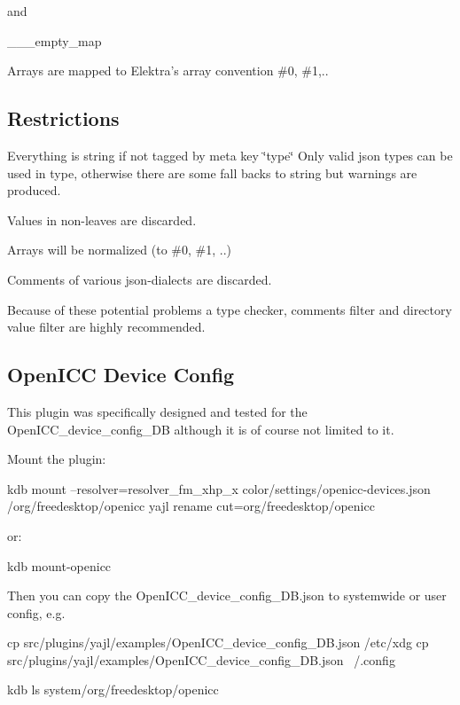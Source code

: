 and \begin{DoxyVerb}    ___empty_map
\end{DoxyVerb}


Arrays are mapped to Elektra's array convention \#0, \#1,..

\subsection*{Restrictions}


\begin{DoxyItemize}
\item Everything is string if not tagged by meta key \char`\"{}type\char`\"{} Only valid json types can be used in type, otherwise there are some fall backs to string but warnings are produced.
\item Values in non-\/leaves are discarded.
\item Arrays will be normalized (to \#0, \#1, ..)
\item Comments of various json-\/dialects are discarded.
\end{DoxyItemize}

Because of these potential problems a type checker, comments filter and directory value filter are highly recommended.

\subsection*{Open\+I\+C\+C Device Config}

This plugin was specifically designed and tested for the {\ttfamily Open\+I\+C\+C\+\_\+device\+\_\+config\+\_\+\+D\+B} although it is of course not limited to it.

Mount the plugin\+: \begin{DoxyVerb}    kdb mount --resolver=resolver_fm_xhp_x color/settings/openicc-devices.json /org/freedesktop/openicc yajl rename cut=org/freedesktop/openicc
\end{DoxyVerb}


or\+: \begin{DoxyVerb}    kdb mount-openicc
\end{DoxyVerb}


Then you can copy the Open\+I\+C\+C\+\_\+device\+\_\+config\+\_\+\+D\+B.\+json to systemwide or user config, e.\+g. \begin{DoxyVerb}    cp src/plugins/yajl/examples/OpenICC_device_config_DB.json /etc/xdg
    cp src/plugins/yajl/examples/OpenICC_device_config_DB.json ~/.config

    kdb ls system/org/freedesktop/openicc
\end{DoxyVerb}


